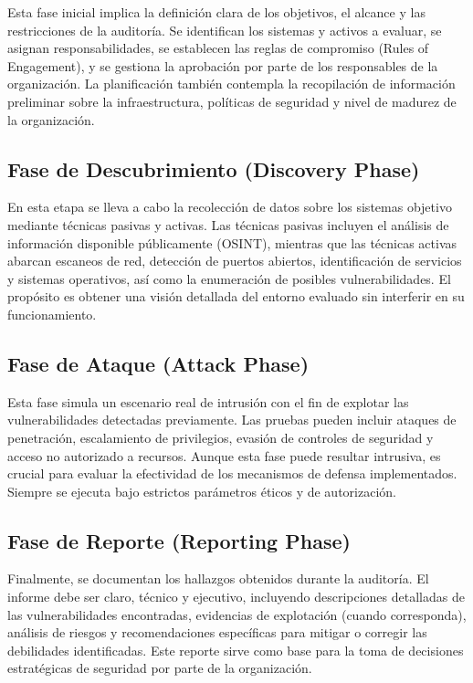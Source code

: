 \documentclass[a4paper, 10pt]{article}
\begin{document}
Esta fase inicial implica la definición clara de los objetivos, el alcance y las restricciones de la auditoría. Se identifican los sistemas y activos a evaluar, se asignan responsabilidades, se establecen las reglas de compromiso (Rules of Engagement), y se gestiona la aprobación por parte de los responsables de la organización. La planificación también contempla la recopilación de información preliminar sobre la infraestructura, políticas de seguridad y nivel de madurez de la organización.


\subsection{Fase de Descubrimiento (Discovery Phase)}

En esta etapa se lleva a cabo la recolección de datos sobre los sistemas objetivo mediante técnicas pasivas y activas. Las técnicas pasivas incluyen el análisis de información disponible públicamente (OSINT), mientras que las técnicas activas abarcan escaneos de red, detección de puertos abiertos, identificación de servicios y sistemas operativos, así como la enumeración de posibles vulnerabilidades. El propósito es obtener una visión detallada del entorno evaluado sin interferir en su funcionamiento.



\subsection{Fase de Ataque (Attack Phase)}

Esta fase simula un escenario real de intrusión con el fin de explotar las vulnerabilidades detectadas previamente. Las pruebas pueden incluir ataques de penetración, escalamiento de privilegios, evasión de controles de seguridad y acceso no autorizado a recursos. Aunque esta fase puede resultar intrusiva, es crucial para evaluar la efectividad de los mecanismos de defensa implementados. Siempre se ejecuta bajo estrictos parámetros éticos y de autorización.


\subsection{Fase de Reporte (Reporting Phase)}

Finalmente, se documentan los hallazgos obtenidos durante la auditoría. El informe debe ser claro, técnico y ejecutivo, incluyendo descripciones detalladas de las vulnerabilidades encontradas, evidencias de explotación (cuando corresponda), análisis de riesgos y recomendaciones específicas para mitigar o corregir las debilidades identificadas. Este reporte sirve como base para la toma de decisiones estratégicas de seguridad por parte de la organización.
\end{document}
